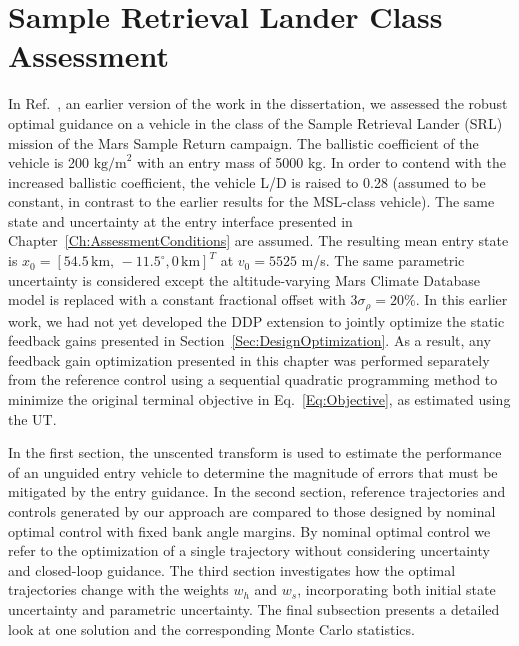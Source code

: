 \chapter{Sample Retrieval Lander Class Assessment}\label{Ch:SRL_EDL}
In Ref.~\cite{MyRobustOCPaper}, an earlier version of the work in the dissertation, we assessed the robust optimal guidance on a vehicle in the class of the Sample Retrieval Lander (SRL) mission of the Mars Sample Return campaign\cite{MSR,MSR2}. The ballistic coefficient of the vehicle is 200 $ \mathrm{kg/m}^2 $ with an entry mass of 5000 kg. In order to contend with the increased ballistic coefficient, the vehicle L/D is raised to 0.28 (assumed to be constant, in contrast to the earlier results for the MSL-class vehicle). The same state and uncertainty at the entry interface presented in Chapter~\ref{Ch:AssessmentConditions} are assumed. The resulting mean entry state is $x_0 = [54.5\,\mathrm{km},\,-11.5^{\circ}, 0\,\mathrm{km}]^T$ at $v_0 = 5525$ m/s. The same parametric uncertainty is considered except the altitude-varying Mars Climate Database model is replaced with a constant fractional offset with $3\sigma_{\rho} = 20$\%. In this earlier work, we had not yet developed the DDP extension to jointly optimize the static feedback gains presented in Section~\ref{Sec:DesignOptimization}. As a result, any feedback gain optimization presented in this chapter was performed separately from the reference control using a sequential quadratic programming method to minimize the original terminal objective in Eq.~\eqref{Eq:Objective}, as estimated using the UT.

In the first section, the unscented transform is used to estimate the performance of an unguided entry vehicle to determine the magnitude of errors that must be mitigated by the entry guidance. In the second section, reference trajectories and controls generated by our approach are compared to those designed by nominal optimal control with fixed bank angle margins. By nominal optimal control we refer to the optimization of a single trajectory without considering uncertainty and closed-loop guidance. The third section investigates how the optimal trajectories change with the weights $w_h$ and $w_s$, incorporating both initial state uncertainty and parametric uncertainty. The final subsection presents a detailed look at one solution and the corresponding Monte Carlo statistics.

